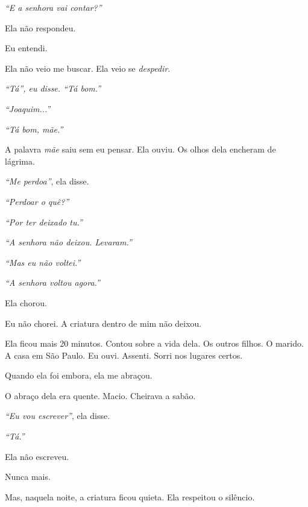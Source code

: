 \noindent \textit{\textquotedblleft{}E a senhora vai contar?\textquotedblright{}}

\noindent Ela não respondeu.

\noindent Eu entendi.

\noindent Ela não veio me buscar.
Ela veio se \textit{despedir}.

\noindent \textit{\textquotedblleft{}Tá\textquotedblright{}\textit{, eu disse. }\textquotedblleft{}Tá bom.\textquotedblright{}}

\noindent \textit{\textquotedblleft{}Joaquim...\textquotedblright{}}

\noindent \textit{\textquotedblleft{}Tá bom, mãe.\textquotedblright{}}

\noindent A palavra \textit{mãe} saiu sem eu pensar. Ela ouviu. Os olhos dela encheram de lágrima.

\noindent \textit{\textquotedblleft{}Me perdoa\textquotedblright{}}, ela disse.

\noindent \textit{\textquotedblleft{}Perdoar o quê?\textquotedblright{}}

\noindent \textit{\textquotedblleft{}Por ter deixado tu.\textquotedblright{}}

\noindent \textit{\textquotedblleft{}A senhora não deixou. Levaram.\textquotedblright{}}

\noindent \textit{\textquotedblleft{}Mas eu não voltei.\textquotedblright{}}

\noindent \textit{\textquotedblleft{}A senhora voltou agora.\textquotedblright{}}

\noindent Ela chorou.

\noindent Eu não chorei. A criatura dentro de mim não deixou.

\noindent Ela ficou mais 20 minutos. Contou sobre a vida dela. Os outros filhos. O marido. A casa em São Paulo. Eu ouvi. Assenti. Sorri nos lugares certos.

\noindent Quando ela foi embora, ela me abraçou.

\noindent O abraço dela era quente. Macio. Cheirava a sabão.

\noindent \textit{\textquotedblleft{}Eu vou escrever\textquotedblright{}}, ela disse.

\noindent \textit{\textquotedblleft{}Tá.\textquotedblright{}}

\noindent Ela não escreveu.

\noindent Nunca mais.

\noindent Mas, naquela noite, a criatura ficou quieta. Ela respeitou o silêncio.

